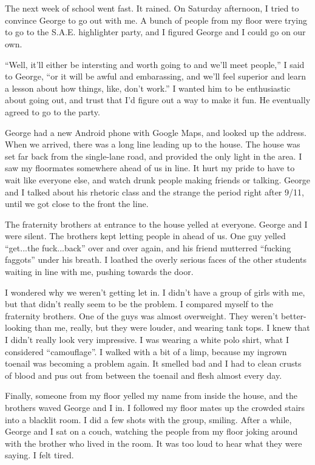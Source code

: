 \section{}

The next week of school went fast.  It rained.  On Saturday afternoon, I tried
to convince George to go out with me.  A bunch of people from my floor were
trying to go to the S.A.E. highlighter party, and I figured George and I could
go on our own.

``Well, it'll either be intersting and worth going to and we'll meet people,'' I
said to George, ``or it will be awful and embarassing, and we'll feel superior
and learn a lesson about how things, like, don't work.''  I wanted him to be
enthusiastic about going out, and trust that I'd figure out a way to make it
fun.  He eventually agreed to go to the party.  

George had a new Android phone with Google Maps, and looked up the address.
When we arrived, there was a long line leading up to the house.  The house was
set far back from the single-lane road, and provided the only light in the area.
I saw my floormates somewhere ahead of us in line.   It hurt my pride to have to
wait like everyone else, and watch drunk people making friends or talking.
George and I talked about his rhetoric class and the strange the period right
after 9/11, until we got close to the front the line.
 
The fraternity brothers at entrance to the house yelled at everyone.  George and
I were silent.  The brothers kept letting people in ahead of us.  One guy yelled
``get...the fuck...back'' over and over again, and his friend mutterred
``fucking faggots'' under his breath.  I loathed the overly serious faces of the
other students waiting in line with me, pushing towards the door.

I wondered why we weren't getting let in.  I didn't have a group of girls with
me, but that didn't really seem to be the problem.  I compared myself to the
fraternity brothers.  One of the guys was almost overweight.  They weren't
better-looking than me, really, but they were louder, and wearing tank tops.  I
knew that I didn't really look very impressive.  I was wearing a white polo
shirt, what I considered ``camouflage''.  I walked with a bit of a limp, because
my ingrown toenail was becoming a problem again.  It smelled bad and I had to
clean crusts of blood and pus out from between the toenail and flesh almost
every day.

Finally, someone from my floor yelled my name from inside the house, and the
brothers waved George and I in.  I followed my floor mates up the crowded stairs
into a blacklit room.  I did a few shots with the group, smiling.  After a
while, George and I sat on a couch, watching the people from my floor joking
around with the brother who lived in the room.  It was too loud to hear what
they were saying.  I felt tired.

